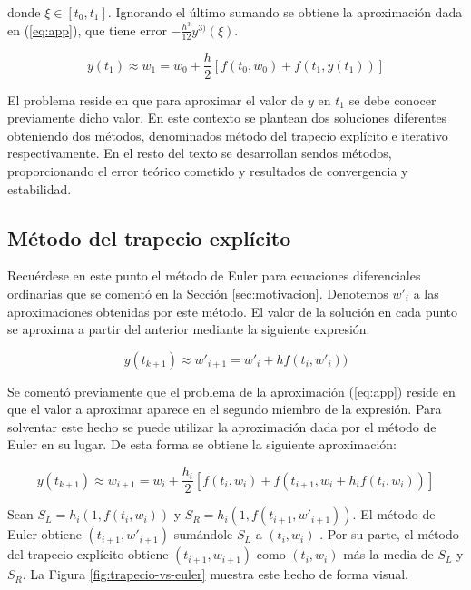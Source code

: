 \documentclass{article}
\theoremstyle{theorem-style}  %
\theoremstyle{definition}
\theoremstyle{example-style}
\begin{document}
	donde $\xi \in [t_0, t_1]$. Ignorando el último sumando se obtiene la aproximación dada en (\ref{eq:app}), que tiene error $- \frac{h^3}{12}y^{3)}(\xi)$.

	\begin{equation} \label{eq:app}
		y(t_1) \approx w_1 = w_0 + \frac{h}{2} \left[f(t_0,w_0) + f(t_1, y(t_1))\right]
	\end{equation}

	El problema reside en que para aproximar el valor de $y$ en $t_1$ se debe conocer previamente dicho valor. En este contexto se plantean dos soluciones diferentes obteniendo dos métodos, denominados método del trapecio explícito e iterativo respectivamente. En el resto del texto se desarrollan sendos métodos, proporcionando el error teórico cometido y resultados de convergencia y estabilidad.
	
	\subsection{Método del trapecio explícito}
		
		Recuérdese en este punto el método de Euler para ecuaciones diferenciales ordinarias que se comentó en la Sección \ref{sec:motivacion}. Denotemos $w'_i$ a las aproximaciones obtenidas por este método. El valor de la solución en cada punto se aproxima a partir del anterior mediante la siguiente expresión:
		
		\begin{equation*} \label{eq:euler}
			y(t_{k+1}) \approx w'_{i+1} = w'_i + h f(t_i,w'_i))
		\end{equation*}

		Se comentó previamente que el problema de la aproximación (\ref{eq:app}) reside en que el valor a aproximar aparece en el segundo miembro de la expresión. Para solventar este hecho se puede utilizar la aproximación dada por el método de Euler en su lugar. De esta forma se obtiene la siguiente aproximación:

		\begin{equation} \label{eq:app-exp}
			y(t_{k+1}) \approx w_{i+1} = w_i + \frac{h_i}{2} \left[f(t_i,w_i) + f(t_{i+1}, w_i + h_if(t_i,w_i))\right]
		\end{equation}

		Sean $S_L = h_i(1, f(t_i,w_i)) $ y $S_R = h_i(1, f(t_{i+1}, w'_{i+1}) )$. El método de Euler  obtiene $(t_{i+1}, w'_{i+1})$ sumándole $S_L$ a $(t_{i}, w_{i})$ . Por su parte, el método del trapecio explícito obtiene $(t_{i+1}, w_{i+1})$ como $(t_{i}, w_{i})$ más la media de $S_L$ y $S_R$. La Figura \ref{fig:trapecio-vs-euler} muestra este hecho de forma visual.
			
\end{document}
